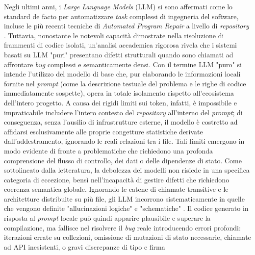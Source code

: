 Negli ultimi anni, i \textit{Large Language Models} (LLM) si sono affermati come lo standard de facto 
per automatizzare \textit{task} complessi di ingegneria del software, incluse le più recenti tecniche 
di \textit{Automated Program Repair} a livello di \textit{repository} \cite{zhang2024llmhallucinations,pabba2025semagent}. 
Tuttavia, nonostante le notevoli capacità dimostrate nella risoluzione di frammenti di codice isolati, 
un'analisi accademica rigorosa rivela che i sistemi basati su LLM "puri" presentano  difetti strutturali 
 quando sono chiamati ad affrontare \textit{bug} complessi e semanticamente densi. 
Con il termine LLM "puro" si intende l'utilizzo del modello di base che, pur elaborando le informazioni 
locali fornite nel \textit{prompt} (come la descrizione testuale del problema e le righe di codice immediatamente sospette), 
opera in totale isolamento rispetto all'ecosistema dell'intero progetto. A causa dei rigidi limiti sui token, 
infatti, è impossibile e impraticabile includere l'intero contesto del \textit{repository} all'interno del 
\textit{prompt}; di conseguenza, senza l'ausilio di infrastrutture esterne, il modello è costretto ad affidarsi esclusivamente alle proprie congetture statistiche derivate
dall'addestramento, ignorando le reali relazioni tra i file.
Tali limiti emergono in modo evidente di fronte a problematiche che richiedono una profonda comprensione del 
flusso di controllo, dei dati o delle dipendenze di stato. Come sottolineato dalla letteratura, la debolezza 
dei modelli non risiede in una specifica categoria di eccezione, bensì nell'incapacità di gestire difetti che 
richiedono coerenza semantica globale. Ignorando le catene di chiamate transitive e le architetture distribuite 
su più file, gli LLM incorrono sistematicamente in quelle che vengono definite "allucinazioni logiche" e "schematiche" \cite{zhang2025semanticforge}. 
Il codice generato in risposta al \textit{prompt} locale può quindi apparire plausibile e superare la compilazione, 
ma fallisce nel risolvere il \textit{bug} reale introducendo errori profondi: iterazioni errate su collezioni, 
omissione di mutazioni di stato necessarie, chiamate ad API inesistenti, o gravi discrepanze di tipo e firma \cite{zhang2025semanticforge,zhang2024llmhallucinations}

